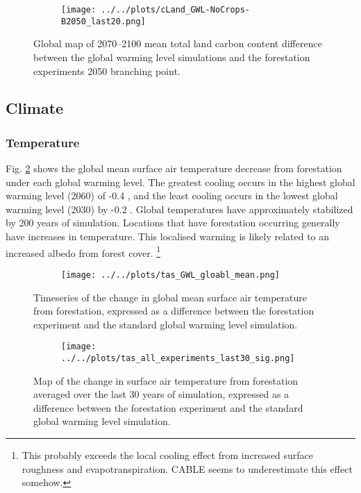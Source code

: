 \documentclass[]{article}
\begin{document}
\begin{figure}[H]
    \centering
    \begin{subfigure}[b]{\linewidth}
        \texttt{[image: ../../plots/cLand\_GWL-NoCrops-B2050\_last20.png]}
    \end{subfigure}
    \caption{Global map of 2070--2100 mean total land carbon content difference between the global warming level simulations and the forestation experiments 2050 branching point.}
    \label{fig:map_cLand}
\end{figure}

\subsection{Climate}

\subsubsection{Temperature}

Fig. \ref{fig:global_temperature_timeseries} shows the global mean surface air temperature decrease from forestation under each global warming level.
The greatest cooling occurs in the highest global warming level (2060) of -0.4 \textcelsius, and the least cooling occurs in the lowest global warming level (2030) by -0.2 \textcelsius{}.
Global temperatures have approximately stabilized by 200 years of simulation.
Locations that have forestation occurring generally have increases in temperature.
This localised warming is likely related to an increased albedo from forest cover.
\footnote{This probably exceeds the local cooling effect from increased surface roughness and evapotranspiration. CABLE seems to underestimate this effect somehow.}

\begin{figure}[H]
    \centering
    \begin{subfigure}[b]{\linewidth}
        \texttt{[image: ../../plots/tas\_GWL\_gloabl\_mean.png]}
    \end{subfigure}
    \caption{Timeseries of the change in global mean surface air temperature from forestation, expressed as a difference between the forestation experiment and the standard global warming level simulation.}
    \label{fig:global_temperature_timeseries}
\end{figure}

\begin{figure}[H]
    \centering
    \begin{subfigure}[b]{\linewidth}
        \texttt{[image: ../../plots/tas\_all\_experiments\_last30\_sig.png]}
    \end{subfigure}
    \caption{Map of the change in surface air temperature from forestation averaged over the last 30 years of simulation, expressed as a difference between the forestation experiment and the standard global warming level simulation.}
    \label{fig:temperature_map}
\end{figure}
\end{document}
